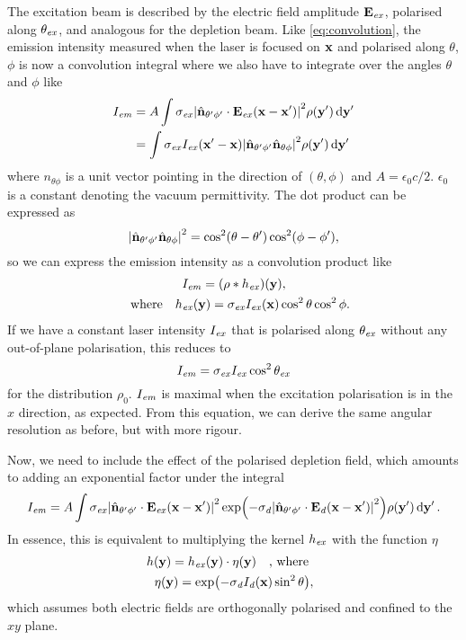 The excitation beam is described by the electric field amplitude $ \vb{E}_{\mathit{ex}} $, polarised along $ \theta_{\mathit{ex}} $, and analogous for the depletion beam. Like \autoref{eq:convolution}, the emission intensity measured when the laser is focused on $ \vb{x} $ and polarised along $ \theta $, $ \phi$ is now a convolution integral where we also have to integrate over the angles $ \theta $ and $ \phi $ like
\begin{equation}
	\begin{aligned}
		I_{\mathit{em}} 
			&= A \int 
				\sigma_{\mathit{ex}} \abs{\hat{\vb{n}}_{\theta'\phi'} \cdot \vb{E}_{\mathit{ex}}(\vb{x}-\vb{x}')}^2 
				\rho(\vb{y}') 
				\dd{\vb{y}'} \\
			&= \int 
				\sigma_{\mathit{ex}} I_{\mathit{ex}}(\vb{x}'-\vb{x}) \abs{\hat{\vb{n}}_{\theta'\phi'}\hat{\vb{n}}_{\theta\phi}}^2
				\rho(\vb{y}') 
				\dd{\vb{y}'}
	\end{aligned}
\end{equation}
where $ \unit{n}_{\theta\phi} $ is a unit vector pointing in the direction of $ (\theta, \phi) $ and $ A = \epsilon_0c/2 $. $ \epsilon_0 $ is a constant denoting the vacuum permittivity. The dot product can be expressed as
\begin{equation}
	\abs{\hat{\vb{n}}_{\theta'\phi'}\hat{\vb{n}}_{\theta\phi}}^2 = \cos^2(\theta-\theta') \cos^2(\phi-\phi'),
\end{equation}
so we can express the emission intensity as a convolution product like
\begin{gather}
	I_\emm = (\rho*h_\exc)(\vb{y}), \\
	\qq{where} h_\exc(\vb{y}) = \sigma_\exc I_\exc(\vb{x}) \cos^2\theta\cos^2\phi.
\end{gather}
If we have a constant laser intensity $ I_{\mathit{ex}} $ that is polarised along $ \theta_{\mathit{ex}} $ without any out-of-plane polarisation, this reduces to
\begin{equation}
	I_{\mathit{em}} = \sigma_{\mathit{ex}} I_{\mathit{ex}} \cos^2\theta_{\mathit{ex}}
\end{equation}
for the distribution $ \rho_0 $. $ I_{\mathit{em}} $ is maximal when the excitation polarisation is in the $ x $ direction, as expected. From this equation, we can derive the same angular resolution as before, but with more rigour.

Now, we need to include the effect of the polarised depletion field, which amounts to adding an exponential factor under the integral
\begin{multline}
	I_{\mathit{em}} = A \int
		\sigma_{\mathit{ex}} \abs{\hat{\vb{n}}_{\theta'\phi'} \cdot \vb{E}_{\mathit{ex}}(\vb{x}-\vb{x}')}^2 
		\exp(-\sigma_{\mathit{d}} \abs{\hat{\vb{n}}_{\theta'\phi'} \cdot \vb{E}_{\mathit{d}}(\vb{x}-\vb{x}')}^2)
		\rho(\vb{y}') 
		\dd{\vb{y}'}.
	\label{eq:psted integral}
\end{multline}
In essence, this is equivalent to multiplying the kernel $ h_{\mathit{ex}} $ with the function $ \eta $
\begin{gather}
	h(\vb{y}) = h_\exc(\vb{y}) \cdot \eta(\vb{y})  \qq{, where} \\
	\eta(\vb{y}) = \exp(-\sigma_\dep I_\dep(\vb{x}) \sin^2 \theta),
\end{gather}
which assumes both electric fields are orthogonally polarised and confined to the $ xy $ plane.

